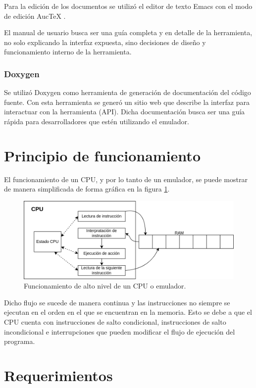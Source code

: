 Para la edición de los documentos se utilizó el editor de texto Emacs con el modo de edición AucTeX \citep{AUCTEX}.

El manual de usuario busca ser una guía completa y en detalle de la herramienta, no solo explicando la interfaz expuesta, sino decisiones de diseño y funcionamiento interno de la herramienta.

\subsubsection{Doxygen}
\label{subsec:doxygen}

Se utilizó Doxygen \citep{DOXYGEN} como herramienta de generación de documentación del código fuente. Con esta herramienta se generó un sitio web que describe la interfaz para interactuar con la herramienta (API). Dicha documentación busca ser una guía rápida para desarrolladores que estén utilizando el emulador.


\section{Principio de funcionamiento}
\label{sec:principio_funcionamiento}

El funcionamiento de un CPU, y por lo tanto de un emulador, se puede mostrar de manera simplificada de forma gráfica en la figura \ref{fig:functionamiento_emulador}.

\begin{figure}[htbp]
	\centering
	\includegraphics[width=1\textwidth]{./Figures/funcionamiento_emulador}
	\caption{Funcionamiento de alto nivel de un CPU o emulador.}
	\label{fig:functionamiento_emulador}
\end{figure}

Dicho flujo se sucede de manera continua y las instrucciones no siempre se ejecutan en el orden en el que se encuentran en la memoria. Esto se debe a que el CPU cuenta con instrucciones de salto condicional, instrucciones de salto incondicional e interrupciones que pueden modificar el flujo de ejecución del programa.


\section{Requerimientos}
\label{sec:requerimientos}


